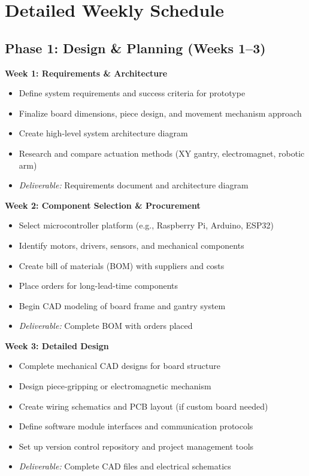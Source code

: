 \documentclass[11pt]{article}
\begin{document}
\vspace{1em}

\section{Detailed Weekly Schedule}

\subsection*{\textcolor{phaseA}{Phase 1: Design \& Planning (Weeks 1--3)}}

\noindent\textbf{Week 1: Requirements \& Architecture}
\begin{itemize}[noitemsep, leftmargin=2em]
    \item Define system requirements and success criteria for prototype
    \item Finalize board dimensions, piece design, and movement mechanism approach
    \item Create high-level system architecture diagram
    \item Research and compare actuation methods (XY gantry, electromagnet, robotic arm)
    \item \textit{Deliverable:} Requirements document and architecture diagram
\end{itemize}

\noindent\textbf{Week 2: Component Selection \& Procurement}
\begin{itemize}[noitemsep, leftmargin=2em]
    \item Select microcontroller platform (e.g., Raspberry Pi, Arduino, ESP32)
    \item Identify motors, drivers, sensors, and mechanical components
    \item Create bill of materials (BOM) with suppliers and costs
    \item Place orders for long-lead-time components
    \item Begin CAD modeling of board frame and gantry system
    \item \textit{Deliverable:} Complete BOM with orders placed
\end{itemize}

\noindent\textbf{Week 3: Detailed Design}
\begin{itemize}[noitemsep, leftmargin=2em]
    \item Complete mechanical CAD designs for board structure
    \item Design piece-gripping or electromagnetic mechanism
    \item Create wiring schematics and PCB layout (if custom board needed)
    \item Define software module interfaces and communication protocols
    \item Set up version control repository and project management tools
    \item \textit{Deliverable:} Complete CAD files and electrical schematics
\end{itemize}
\end{document}
